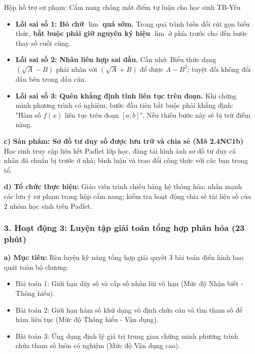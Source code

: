 \documentclass[12pt, a4paper]{article}
\begin{document}
\begin{scaffoldbox}{Hộp hỗ trợ sư phạm: Cẩm nang chống mất điểm tự luận cho học sinh TB-Yếu}
\begin{itemize}[leftmargin=0.6cm]
    \item \textbf{Lỗi sai số 1: Bỏ chữ $\lim$ quá sớm.} Trong quá trình biến đổi rút gọn biểu thức, \textbf{bắt buộc phải giữ nguyên ký hiệu $\lim$} ở phía trước cho đến bước thay số cuối cùng.
    \item \textbf{Lỗi sai số 2: Nhân liên hợp sai dấu.} Cần nhớ: Biểu thức dạng $(\sqrt{A} - B)$ phải nhân với $(\sqrt{A} + B)$ để được $A - B^2$; tuyệt đối không đổi dấu bên trong dấu căn.
    \item \textbf{Lỗi sai số 3: Quên khẳng định tính liên tục trên đoạn.} Khi chứng minh phương trình có nghiệm, bước đầu tiên bắt buộc phải khẳng định: "Hàm số $f(x)$ liên tục trên đoạn $[a; b]$". Nếu thiếu bước này sẽ bị trừ điểm nặng.
\end{itemize}
\end{scaffoldbox}

\noindent \textbf{c) Sản phẩm: Sơ đồ tư duy số được lưu trữ và chia sẻ (Mã 2.4NC1b)}
Học sinh truy cập liên kết Padlet lớp học, đăng tải hình ảnh sơ đồ tư duy cá nhân đã chuẩn bị trước ở nhà; bình luận và trao đổi công thức với các bạn trong tổ.

\noindent \textbf{d) Tổ chức thực hiện:}
Giáo viên trình chiếu bảng hệ thống hóa; nhấn mạnh các lưu ý sư phạm trong hộp cẩm nang; kiểm tra hoạt động chia sẻ tài liệu số của 2 nhóm học sinh trên Padlet.

\subsubsection*{3. Hoạt động 3: Luyện tập giải toán tổng hợp phân hóa (23 phút)}

\noindent \textbf{a) Mục tiêu:}
Rèn luyện kỹ năng tổng hợp giải quyết 3 bài toán điển hình bao quát toàn bộ chương:
\begin{itemize}[leftmargin=0.6cm]
    \item Bài toán 1: Giới hạn dãy số và cấp số nhân lùi vô hạn (Mức độ Nhận biết - Thông hiểu).
    \item Bài toán 2: Giới hạn hàm số khử dạng vô định chứa căn và tìm tham số để hàm liên tục (Mức độ Thông hiểu - Vận dụng).
    \item Bài toán 3: Ứng dụng định lý giá trị trung gian chứng minh phương trình chứa tham số luôn có nghiệm (Mức độ Vận dụng cao).
\end{itemize}
\end{document}
